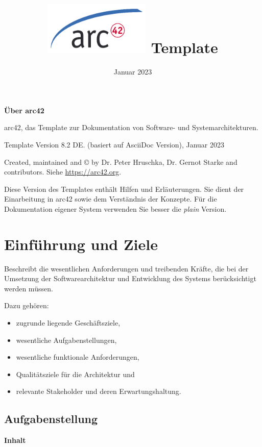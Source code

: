 \documentclass[
]{article}
\title{\includegraphics{images/arc42-logo.png} Template}
\author{}
\date{Januar 2023}
\begin{document}
\maketitle

\section{}

\textbf{Über arc42}

arc42, das Template zur Dokumentation von Software- und
Systemarchitekturen.

Template Version 8.2 DE. (basiert auf AsciiDoc Version), Januar 2023

Created, maintained and © by Dr. Peter Hruschka, Dr. Gernot Starke and
contributors. Siehe \url{https://arc42.org}.

Diese Version des Templates enthält Hilfen und Erläuterungen. Sie dient
der Einarbeitung in arc42 sowie dem Verständnis der Konzepte. Für die
Dokumentation eigener System verwenden Sie besser die \emph{plain}
Version.

\hypertarget{section-introduction-and-goals}{%
\section{Einführung und Ziele}\label{section-introduction-and-goals}}

Beschreibt die wesentlichen Anforderungen und treibenden Kräfte, die bei
der Umsetzung der Softwarearchitektur und Entwicklung des Systems
berücksichtigt werden müssen.

Dazu gehören:

\begin{itemize}
\item
  zugrunde liegende Geschäftsziele,
\item
  wesentliche Aufgabenstellungen,
\item
  wesentliche funktionale Anforderungen,
\item
  Qualitätsziele für die Architektur und
\item
  relevante Stakeholder und deren Erwartungshaltung.
\end{itemize}

\hypertarget{_aufgabenstellung}{%
\subsection{Aufgabenstellung}\label{_aufgabenstellung}}

\textbf{Inhalt}
\end{document}
